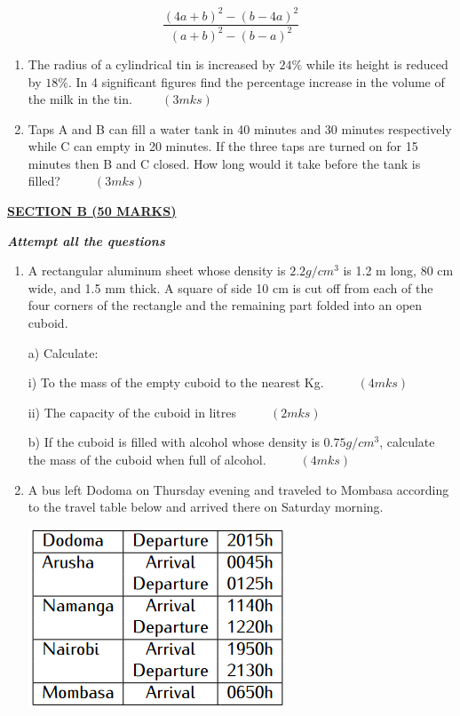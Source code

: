 \documentclass[
  a4paperpaper,
]{scrbook}
\begin{document}
\begin{tcolorbox}
\[\frac{(4a+b)^2-(b-4a)^2}{(a+b)^2-(b-a)^2}\]

\begin{enumerate}
\def\labelenumi{\arabic{enumi}.}
\setcounter{enumi}{14}
\item
  The radius of a cylindrical tin is increased by \(24\%\) while its
  height is reduced by \(18\%\). In 4 significant figures find the
  percentage increase in the volume of the milk in the
  tin.\(\hspace{1cm} (3mks)\)
\item
  Taps A and B can fill a water tank in 40 minutes and 30 minutes
  respectively while C can empty in 20 minutes. If the three taps are
  turned on for 15 minutes then B and C closed. How long would it take
  before the tank is filled? \(\hspace{1cm} (3mks)\)
\end{enumerate}

\ul{\textbf{SECTION B (50 MARKS)}}

\textbf{\emph{Attempt all the questions}}

\begin{enumerate}
\def\labelenumi{\arabic{enumi}.}
\setcounter{enumi}{16}
\item
  A rectangular aluminum sheet whose density is \(2.2 g/cm^3\) is 1.2 m
  long, 80 cm wide, and 1.5 mm thick. A square of side 10 cm is cut off
  from each of the four corners of the rectangle and the remaining part
  folded into an open cuboid.

  a) Calculate:

  i) To the mass of the empty cuboid to the nearest Kg.
  \(\hspace{1cm} (4mks)\)

  ii) The capacity of the cuboid in litres \(\hspace{1cm} (2mks)\)

  b) If the cuboid is filled with alcohol whose density is
  \(0.75 g/cm^3\), calculate the mass of the cuboid when full of
  alcohol. \(\hspace{1cm}(4mks)\)
\item
  A bus left Dodoma on Thursday evening and traveled to Mombasa
  according to the travel table below and arrived there on Saturday
  morning.

  \includegraphics{figures/Md3_Q18.png}


\end{enumerate}
\end{tcolorbox}
\end{document}
